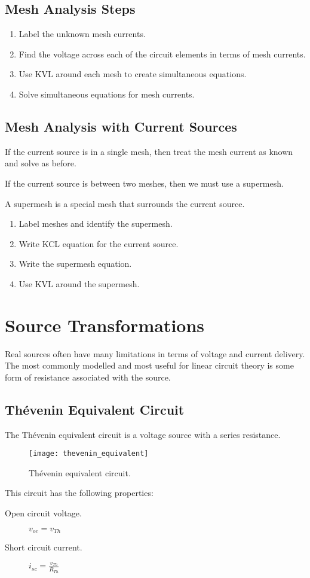 \documentclass{article}
\begin{document}
\subsection{Mesh Analysis Steps}
\begin{enumerate}
    \item Label the unknown mesh currents.
    \item Find the voltage across each of the circuit elements in terms of mesh currents.
    \item Use KVL around each mesh to create simultaneous equations.
    \item Solve simultaneous equations for mesh currents.
\end{enumerate}
\subsection{Mesh Analysis with Current Sources}
If the current source is in a single mesh, then treat the mesh current as known and solve as before.

If the current source is between two meshes, then we must use a supermesh.
\begin{definition}[Supermesh]
    A supermesh is a special mesh that surrounds the current source.
\end{definition}
\begin{enumerate}
    \item Label meshes and identify the supermesh.
    \item Write KCL equation for the current source.
    \item Write the supermesh equation.
    \item Use KVL around the supermesh.
\end{enumerate}
\newpage
\section{Source Transformations}
Real sources often have many limitations in terms of voltage and current delivery.
The most commonly modelled and most useful for linear circuit theory is some form of
resistance associated with the source.
\subsection{Thévenin Equivalent Circuit}
\begin{definition}
    The Thévenin equivalent circuit is a voltage source with a series resistance.
    \begin{figure}[H]
        \centering
        \texttt{[image: thevenin\_equivalent]}
        \caption{Thévenin equivalent circuit.}
    \end{figure}
    This circuit has the following properties:
    \begin{description}
        \item[Open circuit voltage.] $v_{oc} = v_{Th}$
        \item[Short circuit current.] $i_{sc} = \frac{v_{Th}}{R_{Th}}$
    \end{description}
\end{definition}
\end{document}
